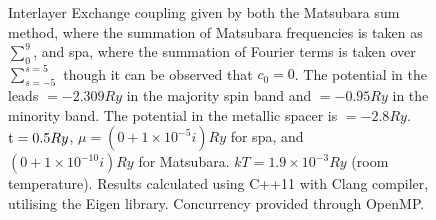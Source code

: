 \documentclass[a4paper, 12pt]{article}
\begin{document}
	\tikzset{external/export next=false}
\pgfplotsset{width=5.6in}
\pgfplotsset{height=3in}
\begin{figure}[H]
	\centering
{}
\caption{\footnotesize
	Interlayer Exchange coupling given by both the Matsubara sum method, where the summation of Matsubara frequencies is taken as $\sum_0^9$, and \gls{spa}, where the summation of Fourier terms is taken over $\sum_{s=-5}^{s=5}$ though it can be observed that $c_0 = 0$. The potential in the leads $= -2.309Ry$ in the majority spin band and $=-0.95Ry$ in the minority band. The potential in the metallic spacer is $= -2.8Ry$. ${\rm t} = 0.5Ry$, $\mu= (0 + 1\times 10^{-5}i)Ry$ for \gls{spa}, and $(0+1\times 10^{-10}i)Ry$ for Matsubara. $kT = 1.9\times 10^{-3}Ry$ (room temperature).  Results calculated using C++11 with Clang compiler, utilising the Eigen library. Concurrency provided through OpenMP. }\label{fig:3rd}
	
\end{figure}
\end{document}
